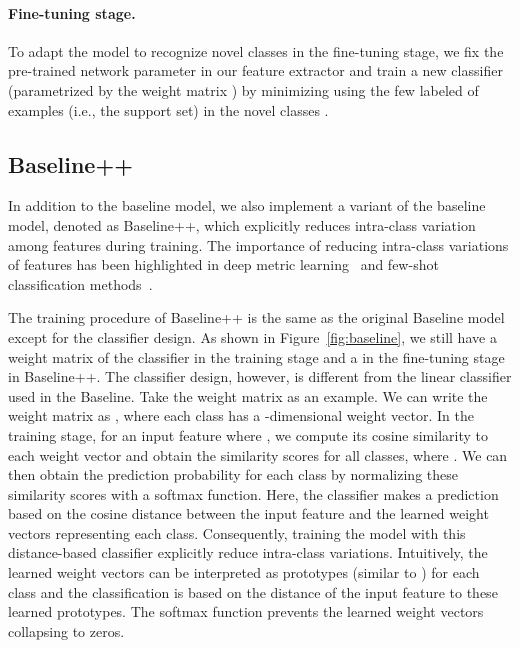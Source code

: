 \documentclass{article}
\newlength\paramargin
\newlength\secmargin
\newcommand{\figref}[1]{Figure~\ref{fig:#1}}
\newcommand {\zsolt}[1]{{\color{purple}\textbf{Zsolt: }#1}\normalfont}
\renewcommand{\zsolt}[1]{}
\begin{document}
\zsolt{REMOVED: Note that the training procedure in our baseline model does not involve sampling mini-batches of classes and data points (episode) as in typical meta-learning algorithms.}

\vspace{\paramargin}
\paragraph{Fine-tuning stage.} To adapt the model to recognize novel classes in the fine-tuning stage, we fix the pre-trained network parameter  in our feature extractor  and train a new classifier  (parametrized by the weight matrix ) by minimizing  using the few labeled of examples (i.e., the support set) in the novel classes .







\vspace{\secmargin}
\subsection{Baseline++}
\label{sec:baselineplus}

In addition to the baseline model, we also implement a variant of the baseline model, denoted as Baseline++, which explicitly reduces intra-class variation among features during training. The importance of reducing intra-class variations of features has been highlighted in deep metric learning~\cite{hu2015deep} and few-shot classification methods~\cite{gidaris2018dynamic}. 


The training procedure of Baseline++ is the same as the original Baseline model except for the classifier design. As shown in \figref{baseline}, we still have a weight matrix  of the classifier in the training stage and a  in the fine-tuning stage in Baseline++.
The classifier design, however, is different from the linear classifier used in the Baseline. Take the weight matrix  as an example. We can write the weight matrix  as , where each class has a -dimensional weight vector. 
In the training stage, for an input feature  where , we compute its cosine similarity to each weight vector  and obtain the similarity scores  
for all classes, where . 
We can then obtain the prediction probability for each class by normalizing these similarity scores with a softmax function.
Here, the classifier makes a prediction based on the cosine distance between the input feature and the learned weight vectors representing each class. Consequently, training the model with this distance-based classifier explicitly reduce intra-class variations.
Intuitively, the learned weight vectors  can be interpreted as prototypes (similar to \cite{snell2017prototypical,vinyals2016matching}) for each class and the classification is based on the distance of the input feature to these learned prototypes. The softmax function prevents the learned weight vectors collapsing to zeros.
\end{document}
